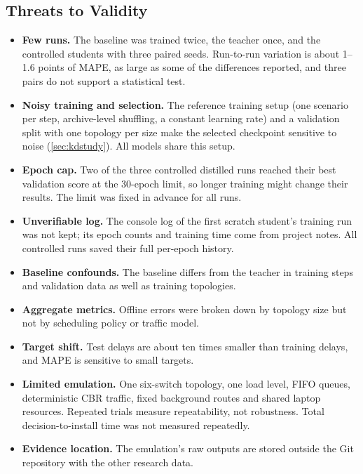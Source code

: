 \subsection{Threats to Validity}
\label{sec:threats}

\begin{itemize}
  \item \textbf{Few runs.} The baseline was trained twice, the teacher once, and the controlled students with three paired seeds. Run-to-run variation is about 1--1.6 points of MAPE, as large as some of the differences reported, and three pairs do not support a statistical test.
  \item \textbf{Noisy training and selection.} The reference training setup (one scenario per step, archive-level shuffling, a constant learning rate) and a validation split with one topology per size make the selected checkpoint sensitive to noise (\cref{sec:kdstudy}). All models share this setup.
  \item \textbf{Epoch cap.} Two of the three controlled distilled runs reached their best validation score at the 30-epoch limit, so longer training might change their results. The limit was fixed in advance for all runs.
  \item \textbf{Unverifiable log.} The console log of the first scratch student's training run was not kept; its epoch counts and training time come from project notes. All controlled runs saved their full per-epoch history.
  \item \textbf{Baseline confounds.} The baseline differs from the teacher in training steps and validation data as well as training topologies.
  \item \textbf{Aggregate metrics.} Offline errors were broken down by topology size but not by scheduling policy or traffic model.
  \item \textbf{Target shift.} Test delays are about ten times smaller than training delays, and MAPE is sensitive to small targets.
  \item \textbf{Limited emulation.} One six-switch topology, one load level, FIFO queues, deterministic CBR traffic, fixed background routes and shared laptop resources. Repeated trials measure repeatability, not robustness. Total decision-to-install time was not measured repeatedly.
  \item \textbf{Evidence location.} The emulation's raw outputs are stored outside the Git repository with the other research data.
\end{itemize}

